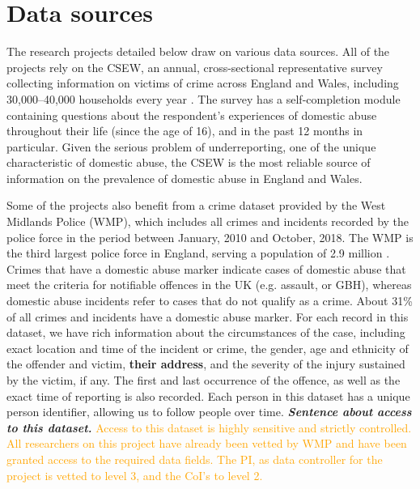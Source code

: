 \documentclass[11pt, a4paper]{article}
\newcommand{\TM}[1] {{\textcolor{orange}{#1}}}
\begin{document}


\section{Data sources}

The research projects detailed below draw on various data sources. All of the projects rely on the CSEW, an annual, cross-sectional representative survey collecting information on victims of crime across England and Wales, including 30,000--40,000 households every year \cite{OfficeforNationalStatistics2019}. The survey has a self-completion module containing questions about the respondent's experiences of domestic abuse throughout their life (since the age of 16), and in the past 12 months in particular. Given the serious problem of underreporting, one of the unique characteristic of domestic abuse, the CSEW is the most reliable source of information on the prevalence of domestic abuse in England and Wales. 

Some of the projects also benefit from a crime dataset provided by the West Midlands Police (WMP), which includes all crimes and incidents recorded by the police force in the period between January, 2010 and October, 2018. The WMP is the third largest police force in England, serving a population of 2.9 million \cite{Homeoffice}. Crimes that have a domestic abuse marker indicate cases of domestic abuse that meet the criteria for notifiable offences in the UK (e.g. assault, or GBH), whereas domestic abuse incidents refer to cases that do not qualify as a crime. About 31\% of all crimes and incidents have a domestic abuse marker. For each record in this dataset, we have rich information about the circumstances of the case, including exact location and time of the incident or crime, the gender, age and ethnicity of the offender and victim, \textbf{their address}, and the severity of the injury sustained by the victim, if any. The first and last occurrence of the offence, as well as the exact time of reporting is also recorded. Each person in this dataset has a unique person identifier, allowing us to follow people over time. \textbf{\emph{\textit{Sentence about access to this dataset.}}} \TM{Access to this dataset is highly sensitive and strictly controlled. All researchers on this project have already been vetted by WMP and have been granted access to the required data fields. The PI, as data controller for the project is vetted to level 3, and the CoI's to level 2.}
\end{document}
